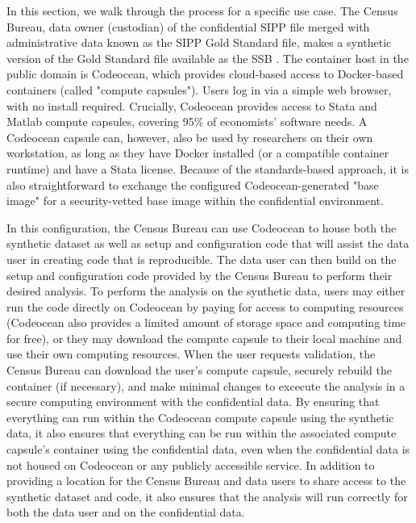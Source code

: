 \documentclass[]{hdsr}
\begin{document}
In this section, we walk through the process for a specific use case. The Census Bureau, data owner (custodian) of the confidential SIPP file merged with administrative data known as the SIPP Gold Standard file, makes a synthetic version of the Gold Standard file available as the \ac{SSB} \citep{Benedettoetal_2013}. The container host in the public domain is Codeocean, which provides cloud-based access to Docker-based containers (called "compute capsules"). Users log in via a simple web browser, with no install required. Crucially, Codeocean provides access to Stata and Matlab compute capsules, covering 95\% of economists' software needs. A Codeocean capsule can, however, also be used by researchers on their own workstation, as long as they have Docker installed (or a compatible container runtime) and have a Stata license. Because of the standards-based approach, it is also straightforward to exchange the configured Codeocean-generated "base image" for a security-vetted base image within the confidential environment.

In this configuration, the Census Bureau can use Codeocean to house both the synthetic dataset as well as
setup and configuration code that will assist the data user in creating code that is reproducible. The data
user can then build on the setup and configuration code provided by the Census Bureau to perform their
desired analysis. To perform the analysis on the synthetic data, users may either run the code directly on
Codeocean by paying for access to computing resources (Codeocean also provides a limited amount of
storage space and computing time for free), or they may download the compute capsule to their local
machine and use their own computing resources. When the user requests validation, the Census
Bureau can download the user’s compute capsule, securely rebuild the container (if necessary), and make minimal changes to excecute the analysis in a
secure computing environment with the confidential data. By ensuring that everything can
run within the Codeocean compute capsule using the synthetic data, it also ensures that everything can
be run within the associated compute capsule's container using the confidential data, even when the confidential data is not housed on Codeocean or any publicly accessible service.
In addition to providing a location for the Census Bureau and data users to share access to the synthetic
dataset and code, it also ensures that the analysis will run correctly for both the data user and on the
confidential data. 
\end{document}
